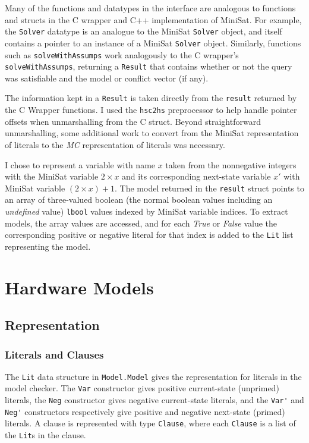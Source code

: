 \documentclass[12pt,a4paper,twoside,openright]{report}
\begin{document}
{Many of the functions and datatypes in the interface are analogous to functions and structs in
the C wrapper and C++ implementation of MiniSat. For example, the \verb,Solver, datatype is an
analogue to the MiniSat \verb,Solver, object, and itself contains a pointer to an instance of
a MiniSat \verb,Solver, object. Similarly, functions such as \verb,solveWithAssumps, work
analogously to the C wrapper's \verb,solveWithAssumps,, returning a \verb,Result, that contains
whether or not the query was satisfiable and the model or conflict vector (if any).

The information kept in a \verb,Result, is taken directly from the \verb,result, returned by
the C Wrapper functions. I used the \verb,hsc2hs, preprocessor to help handle pointer offsets
when unmarshalling from the C struct. Beyond straightforward unmarshalling, some additional work
to convert from the MiniSat representation of literals to the \emph{MC} representation of
literals was necessary.

I chose to represent a variable with name $x$ taken from the nonnegative integers with
the MiniSat variable $2 \times x$ and its corresponding next-state variable $x'$
with MiniSat variable $(2 \times x) + 1$. The model returned in the \verb,result, struct
points to an array of three-valued boolean (the normal boolean values including an
\emph{undefined} value) \verb,lbool, values indexed by MiniSat variable indices.
To extract models, the array values are accessed, and for each \emph{True} or \emph{False}
value the corresponding positive or negative literal for that index is added to the
\verb,Lit, list representing the model.

\section{Hardware Models}
\label{impl:representation}
\subsection{Representation}
\subsubsection{Literals and Clauses}
The \verb,Lit, data structure in \verb,Model.Model, gives the representation for literals in
the model checker.
The \verb,Var, constructor gives positive current-state (unprimed) literals, the \verb,Neg,
constructor gives negative current-state literals, and the \verb,Var', and \verb,Neg', constructors
respectively give positive and negative next-state (primed) literals.
A clause is represented with type \verb,Clause,, where each \verb,Clause, is a
list of the \verb,Lit,s in the clause.

}
\end{document}
